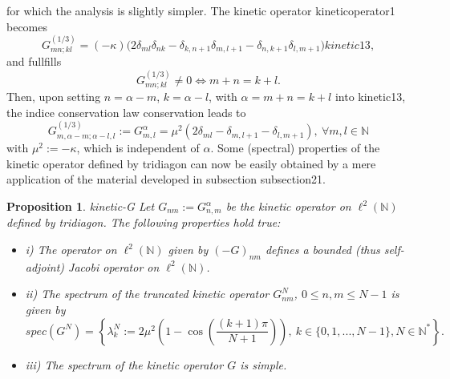 \documentclass[10pt]{book}
\theoremstyle{break}
\newtheorem{proposition}{Proposition}
\begin{document}
for which the analysis is slightly simpler. The kinetic operator {kineticoperator1} becomes
\begin{equation*}
 G^{(1/3)}_{mn;kl}=(-\kappa)\big(2\delta_{ml}\delta_{nk} - \delta_{k,n+1}\delta_{m,l+1}-\delta_{n,k+1}\delta_{l,m+1}\big){kinetic13},
\end{equation*}
and fullfills
\begin{equation*}
G^{(1/3)}_{mn;kl}\ne0\iff m+n=k+l.
\end{equation*}
Then, upon setting $n=\alpha-m$, $k=\alpha-l$, with $\alpha=m+n=k+l$ into {kinetic13}, the indice conservation law {conservation} leads to
\begin{equation*}
G^{(1/3)}_{m,\alpha-m;\alpha-l,l}:=G^{\alpha}_{m,l}=\mu^2(2\delta_{ml}- \delta_{m,l+1}-\delta_{l,m+1}),\ \forall m,l\in\mathbb{N}
\end{equation*}
with $\mu^2:=-\kappa$, which is independent of $\alpha$. Some (spectral) properties of the kinetic operator defined by {tridiagon} can now be easily obtained by a mere application of the material developed in subsection {subsection21}.
\begin{proposition}{kinetic-G}
Let $G_{nm}:=G^{\alpha}_{n,m}$ be the kinetic operator on $\ell^2(\mathbb{N})$ defined by {tridiagon}. The following properties hold true:
\begin{itemize}
\vspace*{-4pt}
\setlength{\itemsep}{-1pt}
\item i) The operator on $\ell^2(\mathbb{N})$ given by $(-G)_{nm}$ defines a bounded (thus self-adjoint) Jacobi operator on $\ell^2(\mathbb{N})$.
\item ii) The spectrum of the truncated kinetic operator $G^N_{nm}$, $0\le n,m\le N-1$ is given by 
\begin{equation*}
spec(G^N)=\left\{\lambda^N_k:=2\mu^2\left(1-\cos(\frac{(k+1)\pi}{N+1})\right), \ k\in\{0,1,...,N-1\}, N\in\mathbb{N}^*\right\}.
\end{equation*}
\item iii) The spectrum of the kinetic operator $G$ is simple.
\end{itemize}
\end{proposition}
\end{document}
